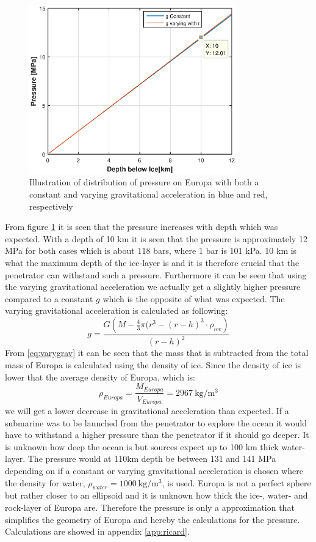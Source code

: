 \begin{figure}[htb]
  \centering
  \includegraphics[width=0.8\textwidth]{figures/Ricardo/pressure.eps}
  \caption{Illustration of distribution of pressure on Europa with both a constant and varying gravitational acceleration in blue and red, respectively}
  \label{fig:Pressure}
\end{figure}
From figure \ref{fig:Pressure} it is seen that the pressure increases with depth which was expected. With a depth of 10 km it is seen that the pressure is approximately 12 MPa for both cases which is about 118 bars, where 1 bar is 101 kPa. 10 km is what the maximum depth of the ice-layer is and it is therefore crucial that the penetrator can withstand such a pressure. Furthermore it can be seen that using the varying gravitational acceleration we actually get a slightly higher pressure compared to a constant $g$ which is the opposite of what was expected. The varying gravitational acceleration is calculated as following: 
\begin{equation}\label{eq:varygrav}
g = \frac{G \left(M - \frac{4}{3} \pi (r^3-(r-h)^3 \cdot \rho _{ice}\right)}{(r-h)^2}
\end{equation}
From \ref{eq:varygrav} it can be seen that the mass that is subtracted from the total mass of Europa is calculated using the density of ice. Since the density of ice is lower that the average density of Europa, which is:
\begin{equation}
\rho_{Europa} = \frac{M_{Europa}}{V_{Europa}} = \SI{2967}{\kilo\gram\per\cubic\metre}
\end{equation}
we will get a lower decrease in gravitational acceleration than expected. If a submarine was to be launched from the penetrator to explore the ocean it would have to withstand a higher pressure than the penetrator if it should go deeper. It is unknown how deep the ocean is but sources expect up to 100 km thick water-layer. The pressure would at 110km depth be between 131 and 141 MPa depending on if a constant or varying gravitational acceleration is chosen where the density for water, $\rho_{water} = \SI{1000}{\kilo\gram\per\cubic\metre}$, is used. Europa is not a perfect sphere but rather closer to an ellipsoid and it is unknown how thick the ice-, water- and rock-layer of Europa are. Therefore the pressure is only a approximation that simplifies the geometry of Europa and hereby the calculations for the pressure. Calculations are showed in appendix \ref{app:ricard}.


